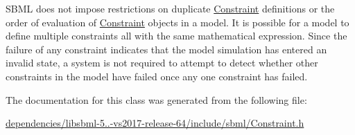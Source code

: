 S\+B\+ML does not impose restrictions on duplicate \hyperlink{class_constraint}{Constraint} definitions or the order of evaluation of \hyperlink{class_constraint}{Constraint} objects in a model. It is possible for a model to define multiple constraints all with the same mathematical expression. Since the failure of any constraint indicates that the model simulation has entered an invalid state, a system is not required to attempt to detect whether other constraints in the model have failed once any one constraint has failed. 

The documentation for this class was generated from the following file\+:\begin{DoxyCompactItemize}
\item 
\hyperlink{dependencies_2libsbml-5_815_80-vs2017-release-64_2include_2sbml_2_constraint_8h}{dependencies/libsbml-\/5..-\/vs2017-\/release-\/64/include/sbml/\+Constraint.\+h}\end{DoxyCompactItemize}
